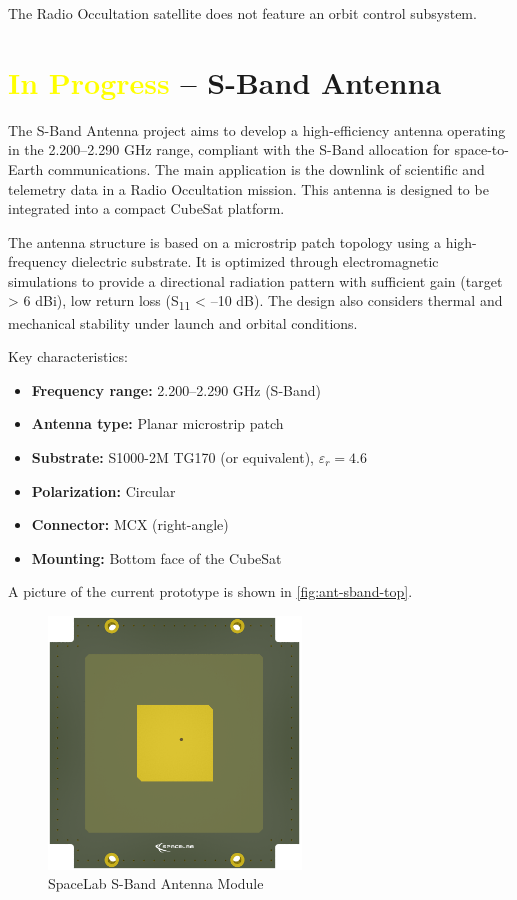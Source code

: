 The Radio Occultation satellite does not feature an orbit control subsystem.


\section{\textcolor{yellow}{In Progress} – S-Band Antenna}

The S-Band Antenna project aims to develop a high-efficiency antenna operating in the 2.200–2.290 GHz range, compliant with the S-Band allocation for space-to-Earth communications. The main application is the downlink of scientific and telemetry data in a Radio Occultation mission. This antenna is designed to be integrated into a compact CubeSat platform.

The antenna structure is based on a microstrip patch topology using a high-frequency dielectric substrate. It is optimized through electromagnetic simulations to provide a directional radiation pattern with sufficient gain (target > 6 dBi), low return loss (S\textsubscript{11} < –10 dB). The design also considers thermal and mechanical stability under launch and orbital conditions.

Key characteristics:
\begin{itemize}
    \item \textbf{Frequency range:} 2.200–2.290 GHz (S-Band)
    \item \textbf{Antenna type:} Planar microstrip patch
    \item \textbf{Substrate:}  S1000-2M TG170 (or equivalent), $\varepsilon_r = 4.6$
    \item \textbf{Polarization:} Circular
    \item \textbf{Connector:} MCX (right-angle)
    \item \textbf{Mounting:} Bottom face of the CubeSat
\end{itemize}

A picture of the current prototype is shown in \autoref{fig:ant-sband-top}.

\begin{figure}[!ht]
    \centering
    \includegraphics[width=0.6\textwidth]{figures/subsystems/sband-antenna-top.png}
    \caption{SpaceLab S-Band Antenna Module}
    \label{fig:ant-sband-top}
\end{figure}


